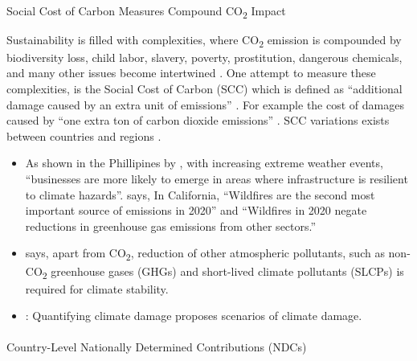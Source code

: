 \documentclass[
  letterpaper,
  DIV=11,
  numbers=noendperiod]{scrartcl}
\makeatletter
\let\oldparagraph\paragraph
\renewcommand{\paragraph}{
    \@ifstar
      \xxxParagraphStar
      \xxxParagraphNoStar
  }
\newcommand{\xxxParagraphStar}[1]{\oldparagraph*{#1}\mbox{}}
\newcommand{\xxxParagraphNoStar}[1]{\oldparagraph{#1}\mbox{}}
\makeatother
\begin{document}
\paragraph{\texorpdfstring{Social Cost of Carbon Measures Compound
CO\textsubscript{2}
Impact}{Social Cost of Carbon Measures Compound CO2 Impact}}\label{social-cost-of-carbon-measures-compound-co2-impact}

Sustainability is filled with complexities, where CO\textsubscript{2}
emission is compounded by biodiversity loss, child labor, slavery,
poverty, prostitution, dangerous chemicals, and many other issues become
intertwined \citep{tedxSustainableBusinessFrank2020}. One attempt to
measure these complexities, is the Social Cost of Carbon (SCC) which is
defined as ``additional damage caused by an extra unit of emissions''
\citep{kornekSocialCostCarbon2021, zhenSimpleEstimateSocial2018}. For
example the cost of damages caused by ``one extra ton of carbon dioxide
emissions'' \citep{stanforduniversityProfessorsExplainSocial2021}. SCC
variations exists between countries \citep{tolSocialCostCarbon2019} and
regions \citep{wangMeasurementChinaProvincial2022}.

\begin{itemize}
\item
  As shown in the Phillipines by \citep{chengAssessingEconomicLoss2022},
  with increasing extreme weather events, ``businesses are more likely
  to emerge in areas where infrastructure is resilient to climate
  hazards''. \citep{jerrettSmokeCaliforniaGreenhouse2022} says, In
  California, ``Wildfires are the second most important source of
  emissions in 2020'' and ``Wildfires in 2020 negate reductions in
  greenhouse gas emissions from other sectors.''
\item
  \citep{linOpportunitiesTackleShortlived2022} says, apart from
  CO\textsubscript{2}, reduction of other atmospheric pollutants, such
  as non-CO\textsubscript{2} greenhouse gases (GHGs) and short-lived
  climate pollutants (SLCPs) is required for climate stability.
\item
  \citep{wangMultimodelAssessmentClimate2022}: Quantifying climate
  damage proposes scenarios of climate damage.
\end{itemize}

\paragraph{Country-Level Nationally Determined Contributions
(NDCs)}\label{country-level-nationally-determined-contributions-ndcs}
\end{document}
